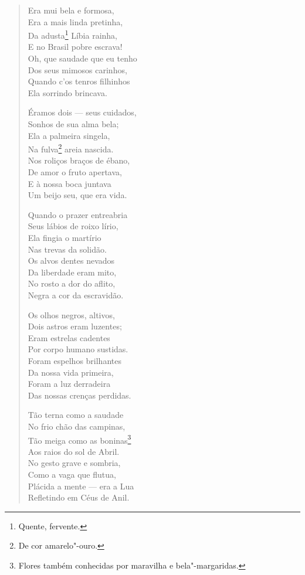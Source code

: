 \begin{verse}
Era mui bela e formosa,\\
Era a mais linda pretinha,\\
Da adusta\footnote{Quente, fervente.} Líbia rainha,\\
E no Brasil pobre escrava!\\
Oh, que saudade que eu tenho\\
Dos seus mimosos carinhos,\\
Quando c'os tenros filhinhos\\
Ela sorrindo brincava.

Éramos dois --- seus cuidados,\\
Sonhos de sua alma bela;\\
Ela a palmeira singela,\\
Na fulva\footnote{De cor amarelo"-ouro.} areia nascida.\\
Nos roliços braços de ébano,\\
De amor o fruto apertava,\\
E à nossa boca juntava\\
Um beijo seu, que era vida.

Quando o prazer entreabria\\
Seus lábios de roixo lírio,\\
Ela fingia o martírio\\
Nas trevas da solidão.\\
Os alvos dentes nevados\\
Da liberdade eram mito,\\
No rosto a dor do aflito,\\
Negra a cor da escravidão.

Os olhos negros, altivos,\\
Dois astros eram luzentes;\\
Eram estrelas cadentes\\
Por corpo humano sustidas.\\
Foram espelhos brilhantes\\
Da nossa vida primeira,\\
Foram a luz derradeira\\
Das nossas crenças perdidas.

Tão terna como a saudade\\
No frio chão das campinas,\\
Tão meiga como as boninas\footnote{Flores também conhecidas por maravilha e bela"-margaridas.}\\
Aos raios do sol de Abril.\\
No gesto grave e sombria,\\
Como a vaga que flutua,\\
Plácida a mente --- era a Lua\\
Refletindo em Céus de Anil.


\end{verse}
